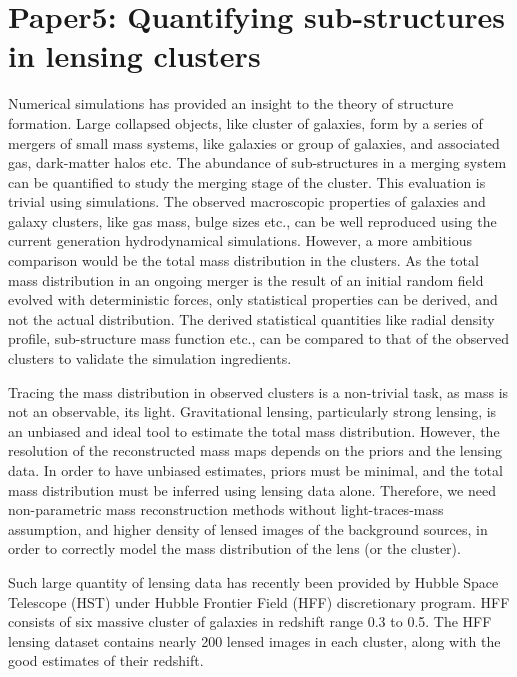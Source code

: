 \chapter{Paper5: Quantifying sub-structures in lensing clusters}\label{paper:substructures}

Numerical simulations has provided an insight to the theory of structure formation. 
Large collapsed objects, like cluster of galaxies, form by a series of mergers of 
small mass systems, like galaxies or group of galaxies, and associated gas, dark-matter
halos etc. The abundance of sub-structures in a merging system can be quantified 
to study the merging stage of the cluster. This evaluation is trivial using simulations. 
The observed macroscopic properties of galaxies and galaxy clusters, like gas mass, bulge sizes
etc., can be well reproduced using the current generation hydrodynamical simulations. 
However, a more ambitious comparison would be the total mass distribution in the
clusters. As the total mass distribution in an ongoing merger is the result
of an initial random field evolved with deterministic forces, only statistical
properties can be derived, and not the actual distribution. The derived statistical
quantities like radial density profile, sub-structure mass function etc., can be
compared to that of the observed clusters to validate the simulation
ingredients. 

Tracing the mass distribution in observed clusters is a non-trivial task, as 
mass is not an observable, its light. Gravitational lensing, particularly
strong lensing, is an unbiased and
ideal tool to estimate the total mass distribution. However, the resolution of the
reconstructed mass maps depends on the priors and the lensing data. In order to
have unbiased estimates, priors must be minimal, and the total mass distribution
must be inferred using lensing data alone. Therefore, we need non-parametric
mass reconstruction methods without light-traces-mass assumption, and higher
density of lensed images of the background sources, in order to correctly model 
the mass distribution of the lens (or the cluster).

Such large quantity of lensing data has recently been provided by Hubble Space
Telescope (HST) under Hubble Frontier Field (HFF) discretionary program. HFF 
consists of six massive cluster of galaxies in redshift range 0.3 to 0.5. The HFF
lensing dataset contains nearly 200 lensed images in each cluster, along 
with the good estimates of their redshift. 

